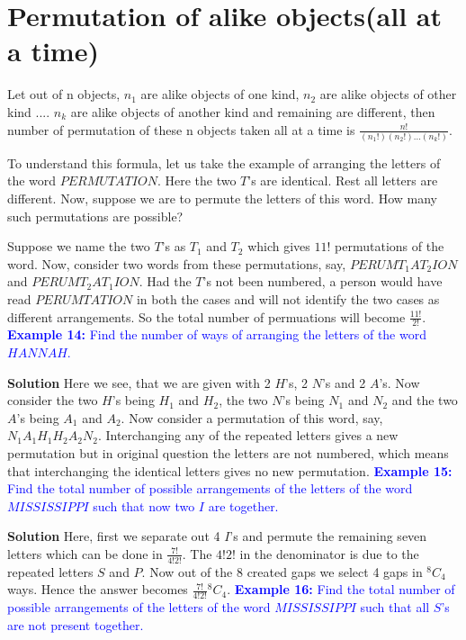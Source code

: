 \documentclass[12pt, a4paper]{article}
\begin{document}
\section{Permutation of alike objects(all at a time)}
\begin{tcolorbox}[colback=TealBlue!10!White,colframe=TealBlue!50!black]
Let out of n objects, $n_1$ are alike objects of one kind, $n_2$ are alike objects of other kind .... $n_k$ are alike objects of another kind and remaining are different, then number of permutation of these n objects taken all at a time is $\frac{n!}{(n_{1}!)(n_{2}!)...(n_{k}!)}$.
\end{tcolorbox}
To understand this formula, let us take the example of arranging the letters of the word $PERMUTATION$. Here the two $T$'s are identical. Rest all letters are different. Now, suppose we are to permute the letters of this word. How many such permutations are possible?

Suppose we name the two $T$'s as $T_1$ and $T_2$ which gives $11!$ permutations of the word. Now, consider two words from these permutations, say, $PERUMT_{1}AT_{2}ION$ and $PERUMT_{2}AT_{1}ION$. Had the $T$'s not been numbered, a person would have read $PERUMTATION$ in both the cases and will not identify the two cases as different arrangements. So the total number of permuations will become $\frac{11!}{2!}$.\newline
\textcolor{blue}{\textbf{Example 14:} Find the number of ways of arranging the letters of the word $HANNAH$.}

\textbf{Solution} Here we see, that we are given with 2 $H$'s, 2 $N$'s and 2 $A$'s. Now consider the two $H$'s being $H_1$ and $H_2$, the two $N$'s being $N_1$ and $N_2$ and the two $A$'s being $A_1$ and $A_2$. Now consider a permutation of this word, say, $N_{1}A_{1}H_{1}H_{2}A_{2}N_{2}$. Interchanging any of the repeated letters gives a new permutation but in original question the letters are not numbered, which means that interchanging the identical letters gives no new permutation.\newline
\textcolor{blue}{\textbf{Example 15:} Find the total number of possible arrangements of the letters of the word $MISSISSIPPI$ such that now two $I$ are together.}

\textbf{Solution} Here, first we separate out 4 $I$'s and permute the remaining seven letters which can be done in $\frac{7!}{4!2!}$. The $4!2!$ in the denominator is due to the repeated letters $S$ and $P$. Now out of the 8 created gaps we select 4 gaps in $^8C_4$ ways. Hence the answer becomes $\frac{7!}{4!2!}{^8C_4}$. \newline
\textcolor{blue}{\textbf{Example 16:} Find the total number of possible arrangements of the letters of the word $MISSISSIPPI$ such that all $S$'s are not present together.}
\end{document}
